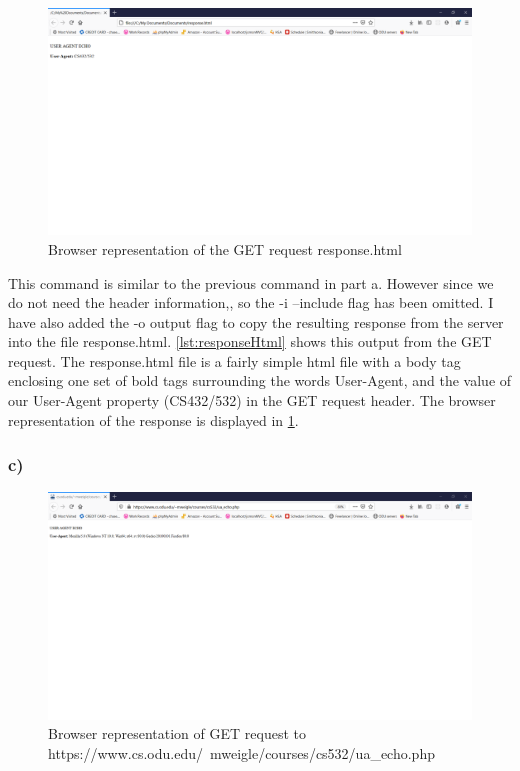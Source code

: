 \documentclass[12pt]{article}
\begin{document}

\begin{figure}[h]
    \centering
    \includegraphics[trim=0 400 300 50, clip, width=\textwidth] {Q2/Q2b_Screenshot.png}
    \caption{Browser representation of the GET request response.html}
    \label{fig:q2BResponse}
\end{figure}

This command is similar to the previous command in part a. However since we do not need the header information,, so the -i --include flag has been omitted. I have also added the -o output flag to copy the resulting
response from the server into the file response.html. \ref{lst:responseHtml} shows this output from the GET request. The response.html file is a fairly simple html file with a body tag enclosing one set of bold tags surrounding the words User-Agent, and  the value of our User-Agent property (CS432/532) in the GET request header. The browser representation of the response is displayed in \ref{fig:q2BResponse}.


\subsubsection*{c)}
\begin{figure}[h]
    \centering
    \includegraphics[trim=0 400 300 50, clip, width=\textwidth] {Q2/Q2c_Screenshot.png}
    \caption{Browser representation of GET request to https://www.cs.odu.edu/~mweigle/courses/cs532/ua\_echo.php }
    \label{fig:q2CResponse}
\end{figure}
\end{document}

